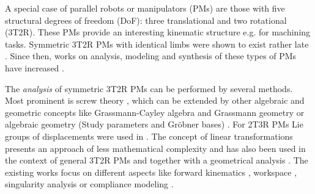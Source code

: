 \documentclass[
	graybox,
	vecphys] %
	{svmult}
\begin{document}
A special case of parallel robots or manipulators (PMs) are those with five structural degrees of freedom (DoF): three translational and two rotational (3T2R).
These PMs provide an interesting kinematic structure e.g. for machining tasks. %
Symmetric 3T2R PMs with identical limbs were shown to exist rather late \cite{FangTsa2002,HuangLi2003}.
Since then, works on analysis, modeling and synthesis of these types of PMs have increased %
\cite{MotevalliZohSoh2010,GallardoAlvaradoAbeIsl2019}.
%
%

The \emph{analysis} of symmetric 3T2R PMs can be performed by several methods.
Most prominent is screw theory \cite{FangTsa2002,KongGos2007,MasoulehGosHusWal2011,GallardoAlvaradoAbeIsl2019}, which can be extended by other algebraic and geometric concepts like Grassmann-Cayley algebra and Grassmann geometry \cite{AmineMasCarWen2012} or algebraic geometry (Study parameters and Gröbner bases) \cite{MasoulehGosHusWal2011}.
For 2T3R PMs Lie groups of displacements were used in \cite{LiHuaHer2004}.
The concept of linear transformations presents an approach of less mathematical complexity and has also been used in the context of general 3T2R PMs \cite{Gogu2008} and together with a geometrical analysis \cite{MotevalliZohSoh2010}.
The existing works focus on different aspects like forward kinematics \cite{MasoulehGosHusWal2011},  %
workspace \cite{MasoulehSaaGosTag2010}, singularity analysis \cite{MasoulehGos2011,AmineMasCarWen2012} or compliance modeling \cite{CaoDinYan2017}.
\end{document}
